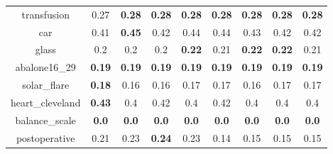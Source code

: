 \documentclass{article}%
\begin{document}
\begin{tabular}{c|cccccccc}
transfusion&0.27&\textbf{0.28}&\textbf{0.28}&\textbf{0.28}&\textbf{0.28}&\textbf{0.28}&\textbf{0.28}&\textbf{0.28}\\%

car&0.41&\textbf{0.45}&0.42&0.44&0.44&0.43&0.42&0.42\\%

glass&0.2&0.2&0.2&\textbf{0.22}&0.21&\textbf{0.22}&\textbf{0.22}&0.21\\%

abalone16\_29&\textbf{0.19}&\textbf{0.19}&\textbf{0.19}&\textbf{0.19}&\textbf{0.19}&\textbf{0.19}&\textbf{0.19}&\textbf{0.19}\\%

solar\_flare&\textbf{0.18}&0.16&0.16&0.17&0.17&0.16&0.17&0.17\\%

heart\_cleveland&\textbf{0.43}&0.4&0.42&0.4&0.42&0.4&0.4&0.4\\%

balance\_scale&\textbf{0.0}&\textbf{0.0}&\textbf{0.0}&\textbf{0.0}&\textbf{0.0}&\textbf{0.0}&\textbf{0.0}&\textbf{0.0}\\%

postoperative&0.21&0.23&\textbf{0.24}&0.23&0.14&0.15&0.15&0.15\\%

\end{tabular}

%
\end{document}
